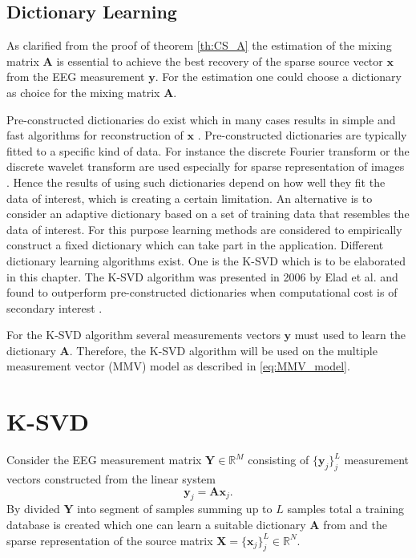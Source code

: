 \subsection{Dictionary Learning}
As clarified from the proof of theorem \ref{th:CS_A} the estimation of the mixing matrix $\mathbf{A}$ is essential to achieve the best recovery of the sparse source vector $\mathbf{x}$ from the EEG measurement $\mathbf{y}$. 
For the estimation one could choose a dictionary as choice for the mixing matrix $\mathbf{A}$.

Pre-constructed dictionaries do exist which in many cases results in simple and fast algorithms for reconstruction of $\mathbf{x}$ \cite{Elad_book}. 
Pre-constructed dictionaries are typically fitted to a specific kind of data. 
For instance the discrete Fourier transform or the discrete wavelet transform are used especially for sparse representation of images \cite{Elad_book}. 
Hence the results of using such dictionaries depend on how well they fit the data of interest, which is creating a certain limitation. 
An alternative is to consider an adaptive dictionary based on a set of training data that resembles the data of interest. 
For this purpose learning methods are considered to empirically construct a fixed dictionary which can take part in the application. 
Different dictionary learning algorithms exist. 
One is the K-SVD which is to be elaborated in this chapter. The K-SVD algorithm was presented in 2006 by Elad et al. and found to outperform pre-constructed dictionaries when computational cost is of secondary interest \cite{Elad2006}. 

For the K-SVD algorithm several measurements vectors $\mathbf{y}$ must used to learn the dictionary $\mathbf{A}$. Therefore, the K-SVD algorithm will be used on the multiple measurement vector (MMV) model as described in \eqref{eq:MMV_model}.

\section{K-SVD}\label{sec:dictionarylearning}
Consider the EEG measurement matrix $\mathbf{Y} \in \mathbb{R}^M$ consisting of $\lbrace \mathbf{y}_j \rbrace_j^L$ measurement vectors constructed from the linear system
$$
\mathbf{y}_j = \mathbf{A}\mathbf{x}_j.
$$ 
By divided $\mathbf{Y}$ into segment of samples summing up to $L$ samples total a training database is created which one can learn a suitable dictionary $\mathbf{A}$ from and the sparse representation of the source matrix $\mathbf{X} = \lbrace \mathbf{x}_j \rbrace_j^L \in \mathbb{R}^N$.

